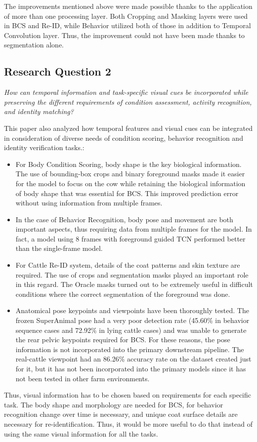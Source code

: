 The improvements mentioned above were made possible thanks to the application of more than one processing layer. Both Cropping and Masking layers were used in BCS and Re-ID, while Behavior utilized both of those in addition to Temporal Convolution layer. Thus, the improvement could not have been made thanks to segmentation alone.

\subsection{Research Question 2}
\textit{How can temporal information and task-specific visual cues be incorporated while preserving the different requirements of condition assessment, activity recognition, and identity matching?}

This paper also analyzed how temporal features and visual cues can be integrated in consideration of diverse needs of condition scoring, behavior recognition and identity verification tasks.:
\begin{itemize}
    \item For Body Condition Scoring, body shape is the key biological information. The use of bounding-box crops and binary foreground masks made it easier for the model to focus on the cow while retaining the biological information of body shape that was essential for BCS. This improved prediction error without using information from multiple frames.
    \item In the case of Behavior Recognition, body pose and movement are both important aspects, thus requiring data from multiple frames for the model. In fact, a model using 8 frames with foreground guided TCN performed better than the single-frame model.
    \item For Cattle Re-ID system, details of the coat patterns and skin texture are required. The use of crops and segmentation masks played an important role in this regard. The Oracle masks turned out to be extremely useful in difficult conditions where the correct segmentation of the foreground was done.
    \item Anatomical pose keypoints and viewpoints have been thoroughly tested. The frozen SuperAnimal pose had a very poor detection rate (45.60\% in behavior sequence cases and 72.92\% in lying cattle cases) and was unable to generate the rear pelvic keypoints required for BCS. For these reasons, the pose information is not incorporated into the primary downstream pipeline. The real-cattle viewpoint had an 86.26\% accuracy rate on the dataset created just for it, but it has not been incorporated into the primary models since it has not been tested in other farm environments.
\end{itemize}
Thus, visual information has to be chosen based on requirements for each specific task. The body shape and morphology are needed for BCS, for behavior recognition change over time is necessary, and unique coat surface details are necessary for re-identification. Thus, it would be more useful to do that instead of using the same visual information for all the tasks.

